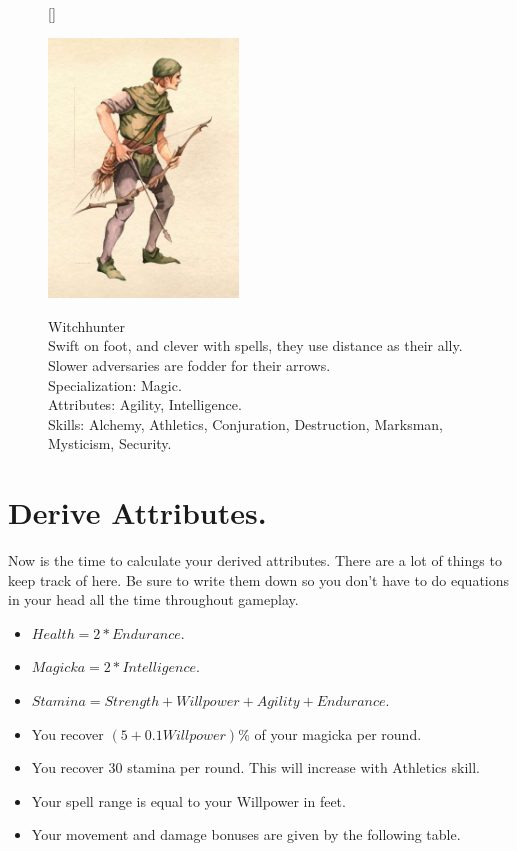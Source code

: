 \documentclass[12pt]{book}
\begin{document}
\begin{figure}[H]
[\FBwidth]
{\caption*{Witchhunter\\

Swift on foot, and clever with spells, they use distance as their ally. Slower adversaries are fodder for their arrows.\\

Specialization: Magic.\\

Attributes: Agility, Intelligence.\\

Skills: Alchemy, Athletics, Conjuration, Destruction, Marksman, Mysticism, Security.}\label{fig:test}}
{\includegraphics[width=0.45\textwidth]{Witchhunter.png}}
\end{figure}

\newpage
\section{Derive Attributes.}
Now is the time to calculate your derived attributes. There are a lot of things to keep track of here. Be sure to write them down so you don't have to do equations in your head all the time throughout gameplay.
\begin{itemize}
	\item $Health=2*Endurance$.
	\item $Magicka=2*Intelligence$.
	\item $Stamina=Strength+Willpower+Agility+Endurance$.
	\item You recover $(5+0.1Willpower)\%$ of your magicka per round.
	\item You recover 30 stamina per round. This will increase with Athletics skill.
	\item Your spell range is equal to your Willpower in feet. 
	\item Your movement and damage bonuses are given by the following table.
\end{itemize}
\end{document}
